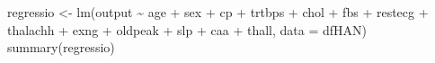 \documentclass[
]{article}
\newenvironment{Shaded}{\begin{snugshade}}{\end{snugshade}}
\newcommand{\AttributeTok}[1]{\textcolor[rgb]{0.80,0.80,0.80}{#1}}
\newcommand{\FunctionTok}[1]{\textcolor[rgb]{0.94,0.94,0.56}{#1}}
\newcommand{\NormalTok}[1]{\textcolor[rgb]{0.80,0.80,0.80}{#1}}
\newcommand{\OtherTok}[1]{\textcolor[rgb]{0.94,0.94,0.56}{#1}}
\newcommand{\SpecialCharTok}[1]{\textcolor[rgb]{0.86,0.64,0.64}{#1}}
\begin{document}
\begin{Shaded}
\begin{Highlighting}[]
\NormalTok{regressio }\OtherTok{\textless{}{-}} \FunctionTok{lm}\NormalTok{(output }\SpecialCharTok{\textasciitilde{}}\NormalTok{ age }\SpecialCharTok{+}\NormalTok{ sex }\SpecialCharTok{+}\NormalTok{ cp }\SpecialCharTok{+}\NormalTok{ trtbps }\SpecialCharTok{+}\NormalTok{ chol }\SpecialCharTok{+}\NormalTok{ fbs }\SpecialCharTok{+}\NormalTok{ restecg }\SpecialCharTok{+}\NormalTok{ thalachh }\SpecialCharTok{+}\NormalTok{ exng }\SpecialCharTok{+}\NormalTok{ oldpeak }\SpecialCharTok{+}\NormalTok{ slp }\SpecialCharTok{+}\NormalTok{ caa }\SpecialCharTok{+}\NormalTok{ thall, }\AttributeTok{data =}\NormalTok{ dfHAN)}
\FunctionTok{summary}\NormalTok{(regressio)}
\end{Highlighting}
\end{Shaded}
\end{document}
